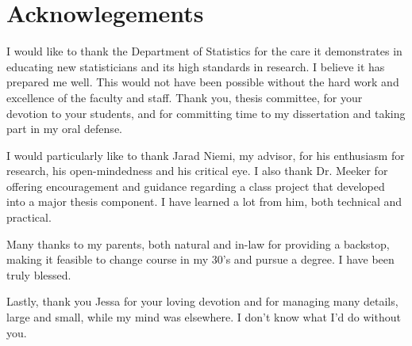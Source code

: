 \section*{Acknowlegements}

I would like to thank the Department of Statistics for the care it demonstrates in educating new statisticians and its high standards in research. I believe it has prepared me well. This would not have been possible without the hard work and excellence of the faculty and staff. Thank you, thesis committee, for your devotion to your students, and for committing time to my dissertation and taking part in my oral defense.

I would particularly like to thank Jarad Niemi, my advisor, for his enthusiasm for research, his open-mindedness and his critical eye. I also thank Dr. Meeker for offering encouragement and guidance regarding a class project that developed into a major thesis component. I have learned a lot from him, both technical and practical.

Many thanks to my parents, both natural and in-law for providing a backstop, making it feasible to change course in my 30's and pursue a degree. I have been truly blessed.

Lastly, thank you Jessa for your loving devotion and for managing many details, large and small, while my mind was elsewhere. I don't know what I'd do without you.